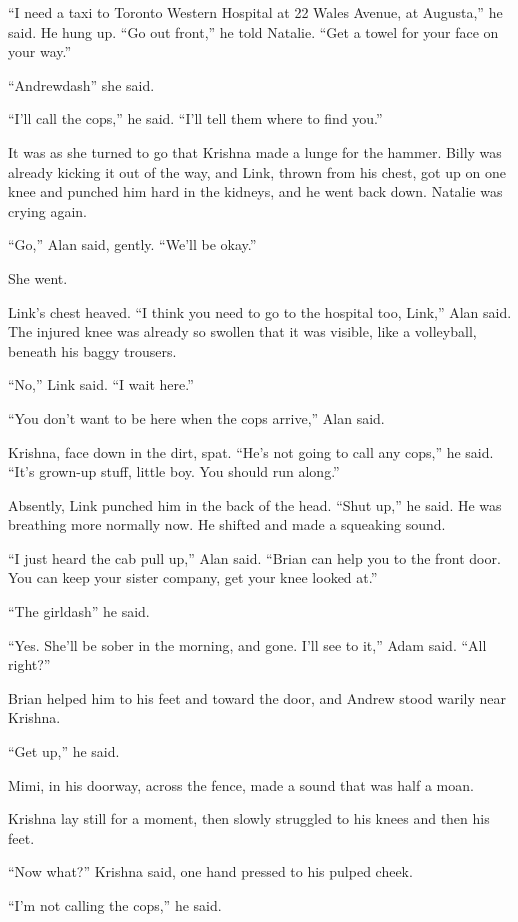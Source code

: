 ``I need a taxi to Toronto Western Hospital at 22 Wales Avenue, at
Augusta,'' he said.  He hung up.  ``Go out front,'' he told Natalie. 
``Get a towel for your face on your way.''

``Andrewdash{}'' she said. 

``I'll call the cops,'' he said.  ``I'll tell them where to find
you.''

It was as she turned to go that Krishna made a lunge for the hammer. 
Billy was already kicking it out of the way, and Link, thrown from his
chest, got up on one knee and punched him hard in the kidneys, and he
went back down.  Natalie was crying again. 

``Go,'' Alan said, gently.  ``We'll be okay.''

She went.

Link's chest heaved.  ``I think you need to go to the hospital too,
Link,'' Alan said.  The injured knee was already so swollen that it
was visible, like a volleyball, beneath his baggy trousers.

``No,'' Link said.  ``I wait here.''

``You don't want to be here when the cops arrive,'' Alan said.

Krishna, face down in the dirt, spat.  ``He's not going to call any
cops,'' he said.  ``It's grown-up stuff, little boy.  You should run
along.''

Absently, Link punched him in the back of the head.  ``Shut up,'' he
said.  He was breathing more normally now.  He shifted and made a
squeaking sound.

``I just heard the cab pull up,'' Alan said.  ``Brian can help you to
the front door.  You can keep your sister company, get your knee
looked at.''

``The girldash{}'' he said.

``Yes.  She'll be sober in the morning, and gone.  I'll see to it,''
Adam said.  ``All right?''

Brian helped him to his feet and toward the door, and Andrew stood
warily near Krishna.

``Get up,'' he said.

Mimi, in his doorway, across the fence, made a sound that was half a
moan.

Krishna lay still for a moment, then slowly struggled to his knees and
then his feet.

``Now what?'' Krishna said, one hand pressed to his pulped cheek.

``I'm not calling the cops,'' he said.

